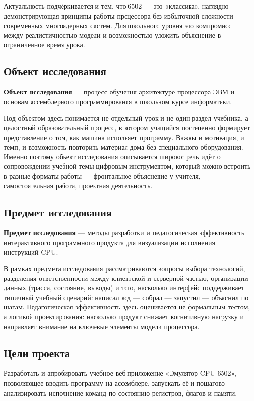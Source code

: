 \documentclass[12pt,a4paper]{article}
\begin{document}
Актуальность подчёркивается и тем, что 6502 --- это «классика», наглядно демонстрирующая принципы работы процессора без избыточной сложности современных многоядерных систем. Для школьного уровня это компромисс между реалистичностью модели и возможностью уложить объяснение в ограниченное время урока.

\subsection{Объект исследования}
\textbf{Объект исследования} --- процесс обучения архитектуре процессора ЭВМ и основам ассемблерного программирования в школьном курсе информатики.

Под объектом здесь понимается не отдельный урок и не один раздел учебника, а целостный образовательный процесс, в котором учащийся постепенно формирует представление о том, как машина исполняет программу. Важны и мотивация, и темп, и возможность повторить материал дома без специального оборудования. Именно поэтому объект исследования описывается широко: речь идёт о сопровождении учебной темы цифровым инструментом, который можно встроить в разные форматы работы --- фронтальное объяснение у учителя, самостоятельная работа, проектная деятельность.

\subsection{Предмет исследования}
\textbf{Предмет исследования} --- методы разработки и педагогическая эффективность интерактивного программного продукта для визуализации исполнения инструкций CPU.

В рамках предмета исследования рассматриваются вопросы выбора технологий, разделения ответственности между клиентской и серверной частью, организации данных (трасса, состояние, выводы) и того, насколько интерфейс поддерживает типичный учебный сценарий: написал код --- собрал --- запустил --- объяснил по шагам. Педагогическая эффективность здесь оценивается не формальным тестом, а логикой проектирования: насколько продукт снижает когнитивную нагрузку и направляет внимание на ключевые элементы модели процессора.

\subsection{Цели проекта}
Разработать и апробировать учебное веб-приложение «Эмулятор CPU 6502», позволяющее вводить программу на ассемблере, запускать её и пошагово анализировать исполнение команд по состоянию регистров, флагов и памяти.
\end{document}
